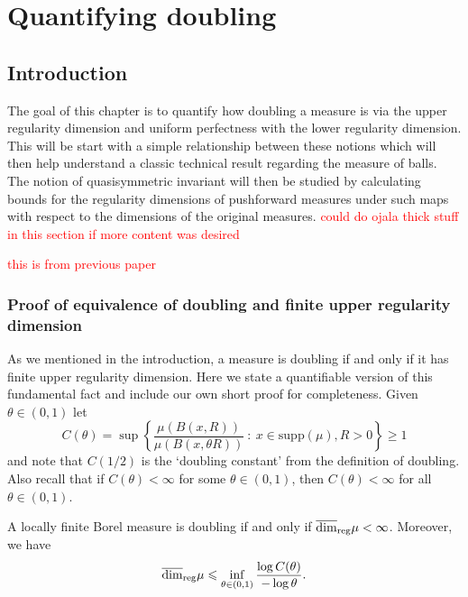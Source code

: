 \chapter{Quantifying doubling}
\label{chap:quantifying}


\section{Introduction}
\label{sec:intro-quantifying}


The goal of this chapter is to quantify how doubling a measure is via the upper regularity dimension and uniform perfectness with the lower regularity dimension. This will be start with a simple relationship between these notions which will then help understand a classic technical result regarding the measure of balls. The notion of quasisymmetric invariant will then be studied by calculating bounds for the regularity dimensions of pushforward measures under such maps with respect to the dimensions of the original measures.
\textcolor{red}{could do ojala thick stuff in this section if more content was desired}

\textcolor{red}{this is from previous paper}
\subsection{Proof of equivalence of doubling and finite upper regularity dimension} \label{ch-upper-reg:doublingproof}

As we mentioned in the introduction, a measure is doubling if and only if it has finite upper regularity dimension. Here we state a quantifiable version of this fundamental fact and include our own short proof for completeness.  Given $\theta \in (0,1)$ let
\[
C(\theta) = \sup \left\{ \frac{\mu(B(x,R))}{\mu(B(x,\theta R))} \ : \ x \in \text{supp}(\mu), R>0 \right\} \geq 1
\]
and note that $C(1/2)$ is the `doubling constant' from the definition of doubling.  Also recall that if $C(\theta) < \infty$ for some $\theta \in (0,1)$, then  $C(\theta) < \infty$ for all $\theta \in (0,1)$.

\begin{prop}\label{ch-upper-reg:doubling2}
	A locally finite Borel measure is doubling if and only if $\overline{\dim}_{\textup{reg}} \mu<\infty$.  Moreover, we have
	\[
	\overline{\dim}_{\textup{reg}} \mu \leqslant \inf_{\theta \in (0,1)} \frac{ \log C(\theta)}{ - \log \theta}.
	\]
\end{prop}


